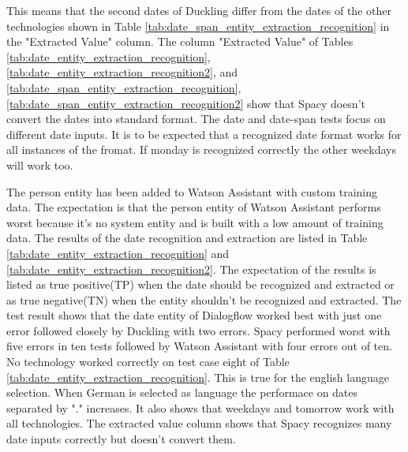 This means that the second dates of Duckling differ from the dates of the other technologies
shown in Table \ref{tab:date_span_entity_extraction_recognition} in the "Extracted Value" column.
The column "Extracted Value" of Tables \ref{tab:date_entity_extraction_recognition},
\ref{tab:date_entity_extraction_recognition2},
and \ref{tab:date_span_entity_extraction_recognition},
\ref{tab:date_span_entity_extraction_recognition2} show that Spacy doesn't 
convert the dates into standard format.
The date and date-span tests focus on different date inputs.
It is to be expected that a recognized date format works for 
all instances of the fromat.
If monday is recognized correctly the other weekdays will work too. 

The person entity has been added to Watson Assistant with custom training data.
The expectation is that the person entity of Watson Assistant performs worst because 
it's no system entity and is built with a low amount of training data.
The results of the date recognition and extraction are listed in Table \ref{tab:date_entity_extraction_recognition}
and \ref{tab:date_entity_extraction_recognition2}.
The expectation of the results is listed as true positive(TP) when the date should be recognized and extracted or as true negative(TN)
when the entity shouldn't be recognized and extracted.
The test result shows that the date entity of Dialogflow worked best with just one error
followed closely by Duckling with two errors.
Spacy performed worst with five errors in ten tests followed by Watson Assistant with four errors out of ten.
No technology worked correctly on test case eight of Table \ref{tab:date_entity_extraction_recognition}.
This is true for the english language selection.
When German is selected as language the performace on dates separated by
"." increases.
It also shows that weekdays and tomorrow work with all technologies.
The extracted value column shows that Spacy recognizes many date inputs correctly but doesn't convert them.

